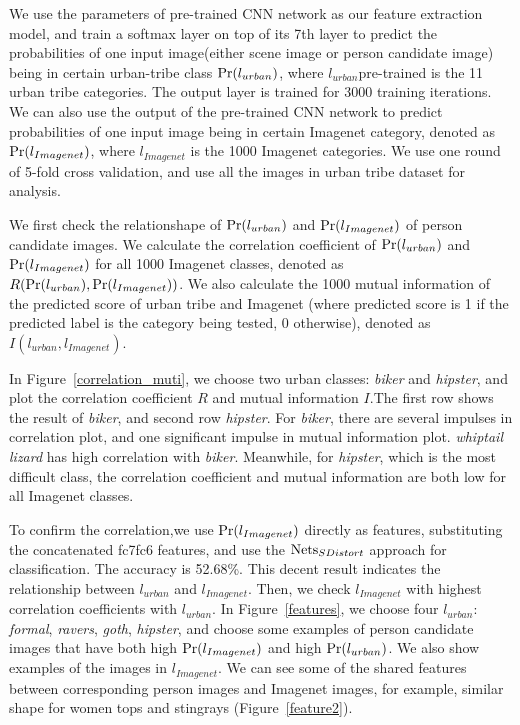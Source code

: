 \documentclass[10pt,twocolumn,letterpaper]{article}
\begin{document}
We use the parameters of pre-trained CNN network as our feature extraction model, and train a softmax layer  
on top of its 7th layer to predict the probabilities of one input image(either scene image or person candidate image) being in certain urban-tribe class $\textup{Pr}(l_{urban})$, where $l_{urban} $pre-trained is the 11 urban tribe categories. The output layer is trained for 3000 training iterations. We can also use the output of the pre-trained CNN network to predict probabilities of one input image being in certain Imagenet category, denoted as $\textup{Pr}(l_{Imagenet})$, where $l_{Imagenet}$ is the 1000 Imagenet categories. We use one round of 5-fold cross validation, and use all the images in urban tribe dataset for analysis.

We first check the relationshape of $\textup{Pr}(l_{urban})$ and $\textup{Pr}(l_{Imagenet})$ of person candidate images. We calculate the correlation coefficient of $\textup{Pr}(l_{urban})$ and $\textup{Pr}(l_{Imagenet})$ for all 1000 Imagenet classes, denoted as $R(\textup{Pr}(l_{urban}), \textup{Pr}(l_{Imagenet}))$. We also calculate the 1000 mutual information of the predicted score of urban tribe and Imagenet (where predicted score is 1 if the predicted label is the category being tested, 0 otherwise), denoted as $I(l_{urban}, l_{Imagenet})$. 

In Figure~\ref{correlation_muti}, we choose two urban classes: \emph{biker} and \emph{hipster}, and plot the correlation coefficient $R$ and mutual information $I$.The first row shows the result of \emph{biker}, and second row \emph{hipster}. For \emph{biker}, there are several impulses in correlation plot, and one significant impulse in mutual information plot. \emph{whiptail lizard} has high correlation with \emph{biker}. Meanwhile, for \emph{hipster}, which is the most difficult class, the correlation coefficient and mutual information are both low for all Imagenet classes.

To confirm the correlation,we use $\textup{Pr}(l_{Imagenet})$ directly as features, substituting the concatenated fc7fc6 features, and use the $\textup{Nets}_{SDistort}$ approach for classification. The accuracy is 52.68\%. This decent result indicates the relationship between $l_{urban}$ and $l_{Imagenet}$.
Then, we check $l_{Imagenet}$ with highest correlation coefficients with $l_{urban}$. In Figure~\ref{features}, we choose four $l_{urban}$: \emph{formal}, \emph{ravers}, \emph{goth}, \emph{hipster}, and choose some examples of person candidate images that have both high $\textup{Pr}(l_{Imagenet})$ and high  $\textup{Pr}(l_{urban})$. We also show examples of the images in $l_{Imagenet}$. We can see some of the shared features between corresponding person images and Imagenet images, for example, similar shape for women tops and stingrays (Figure~\ref{feature2}). 
\end{document}
